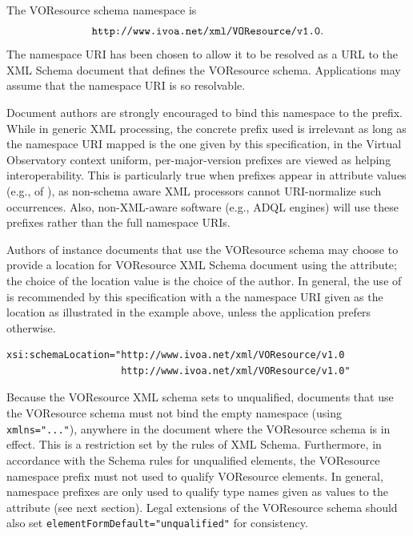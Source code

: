 \documentclass[11pt,a4paper]{ivoa}
\begin{document}
\label{sect:namespace}


The VOResource schema namespace is 
$$\hbox{\texttt{http://www.ivoa.net/xml/VOResource/v1.0}}.$$
The namespace URI has been chosen to allow it to be resolved as a URL
to the XML Schema document that defines the VOResource schema.
Applications may assume that the namespace URI is so resolvable.

Document authors are strongly encouraged to bind this namespace to the
 prefix.  While in generic XML processing, the concrete
prefix used is irrelevant as long as the namespace URI mapped is the one
given by this specification, in the Virtual Observatory context uniform,
per-major-version prefixes are viewed as helping interoperability.  This
is particularly true when prefixes appear in attribute values (e.g.,
of ), as non-schema aware XML processors cannot
URI-normalize such occurrences.  Also, non-XML-aware software (e.g., ADQL
engines) will use these prefixes rather than the full namespace URIs.

Authors of instance documents that use the VOResource schema may choose
to provide a location for VOResource XML Schema document using the
 attribute; the choice of the location value
is the choice of the author.  In general, the use of
 is recommended by this specification with
a the namespace URI given as the location as illustrated in the example
above, unless the application prefers otherwise.


\begin{verbatim}
xsi:schemaLocation="http://www.ivoa.net/xml/VOResource/v1.0
                    http://www.ivoa.net/xml/VOResource/v1.0"
\end{verbatim}

Because the VOResource XML schema sets  to
unqualified, documents that use the VOResource schema must not bind the
empty namespace (using \verb|xmlns="..."|), anywhere in the document
where the VOResource schema is in effect.  This is a restriction set by
the rules of XML Schema.  Furthermore, in accordance with the Schema
rules for unqualified elements, the VOResource namespace prefix must not
used to qualify VOResource elements.  In general, namespace prefixes are
only used to qualify type names given as values to the 
attribute (see next section).  Legal extensions of the VOResource schema
should also set \verb|elementFormDefault="unqualified"| for consistency.
\end{document}
